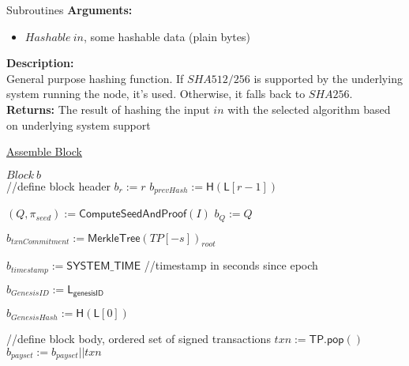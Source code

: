\documentclass[10pt,a4paper]{article}
\begin{document}
\begin{section}{Subroutines}
\noindent \textbf{Arguments:}
\begin{itemize}
    \item $Hashable \ in$, some hashable data (plain bytes)
  \end{itemize}

\noindent \textbf{Description:}\\
General purpose hashing function. If $SHA512/256$ is supported by the underlying system running the node, it's used.
Otherwise, it falls back to $SHA256$.\\

\noindent \textbf{Returns:}
    The result of hashing the input $in$ with the selected algorithm based on underlying system support


\begin{algorithm}[H]
    \caption{\underline{Assemble Block}}    
    \label{algo:assemble-block}
    \begin{algorithmic}[1]

    \State $Block \ b$ \\

    //define block header
    \State $b_{r} := r$
    \State $b_{prevHash} := \mathsf{H}(\mathsf{L}[r-1])$
    
    \State $(Q, \pi_{seed}) := \mathsf{ComputeSeedAndProof}(I)$
    \State $b_{Q} := Q$

    \State $b_{txnCommitment} := \mathsf{MerkleTree}(TP[-s])_{root}$

    \State $b_{timestamp} := \mathsf{SYSTEM\_TIME}$ //timestamp in seconds since epoch

    \State $b_{GenesisID} := \mathsf{L_{genesisID}}$

    \State $b_{GenesisHash} := \mathsf{H}(\mathsf{L}[0])$






    //define block body, ordered set of signed transactions
        \State $txn := \mathsf{TP.pop}()$
            \State $b_{payset} :=  b_{payset}||txn$ \\
        \EndIf
    \EndWhile


\end{algorithmic}
\end{algorithm}
\end{section}
\end{document}
